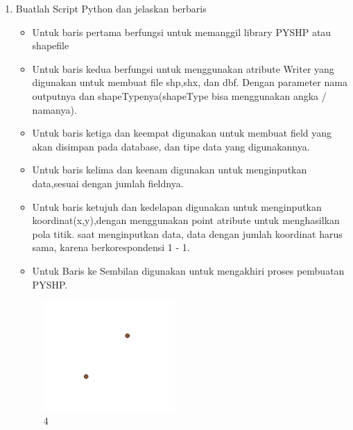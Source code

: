 \begin{enumerate}
	\item Buatlah Script Python dan jelaskan berbaris
	
	\begin{itemize}
		\item Untuk baris pertama berfungsi untuk memanggil library PYSHP atau shapefile
		\item Untuk baris kedua berfungsi untuk menggunakan atribute Writer yang digunakan untuk membuat file shp,shx, dan dbf. \hfill\break Dengan parameter nama outputnya dan shapeTypenya(shapeType bisa menggunakan angka / namanya).
		\item Untuk baris ketiga dan keempat digunakan untuk membuat field yang akan disimpan pada database, dan tipe data yang digunakannya.
		\item Untuk baris kelima dan keenam digunakan untuk menginputkan data,sesuai dengan jumlah fieldnya.
		\item Untuk baris ketujuh dan kedelapan digunakan untuk menginputkan koordinat(x,y),dengan menggunakan point atribute untuk menghasilkan pola titik. \hfill\break
		saat menginputkan data, data dengan jumlah koordinat harus sama, karena berkorespondensi 1 - 1.
		\item Untuk Baris ke Sembilan digunakan untuk mengakhiri proses pembuatan PYSHP.
	\end{itemize}
	\hfill\break
	\begin{figure}[H]
		\includegraphics[width=5cm]{figures/1174009/2/4.png}
		\centering
		\caption{ 4}
	\end{figure}


\end{enumerate}

